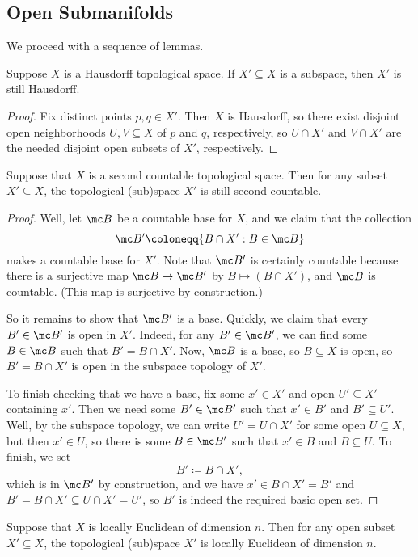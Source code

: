 \documentclass[../notes.tex]{subfiles}
\begin{document}
\subsection{Open Submanifolds}
We proceed with a sequence of lemmas.
\begin{lemma} \label{lem:sub-haus}
	Suppose $X$ is a Hausdorff topological space. If $X'\subseteq X$ is a subspace, then $X'$ is still Hausdorff.
\end{lemma}
\begin{proof}
	Fix distinct points $p,q\in X'$. Then $X$ is Hausdorff, so there exist disjoint open neighborhoods $U,V\subseteq X$ of $p$ and $q$, respectively, so $U\cap X'$ and $V\cap X'$ are the needed disjoint open subsets of $X'$, respectively.
\end{proof}
\begin{lemma} \label{lem:sub-second-countable}
	Suppose that $X$ is a second countable topological space. Then for any subset $X'\subseteq X$, the topological (sub)space $X'$ is still second countable.
\end{lemma}
\begin{proof}
	Well, let $\mc B$ be a countable base for $X$, and we claim that the collection
	\[\mc B'\coloneqq\{B\cap X':B\in\mc B\}\]
	makes a countable base for $X'$. Note that $\mc B'$ is certainly countable because there is a surjective map $\mc B\to\mc B'$ by $B\mapsto(B\cap X')$, and $\mc B$ is countable. (This map is surjective by construction.)

	So it remains to show that $\mc B'$ is a base. Quickly, we claim that every $B'\in\mc B'$ is open in $X'$. Indeed, for any $B'\in\mc B'$, we can find some $B\in\mc B$ such that $B'=B\cap X'$. Now, $\mc B$ is a base, so $B\subseteq X$ is open, so $B'=B\cap X'$ is open in the subspace topology of $X'$.

	To finish checking that we have a base, fix some $x'\in X'$ and open $U'\subseteq X'$ containing $x'$. Then we need some $B'\in\mc B'$ such that $x'\in B'$ and $B'\subseteq U'$. Well, by the subspace topology, we can write $U'=U\cap X'$ for some open $U\subseteq X$, but then $x'\in U$, so there is some $B\in\mc B'$ such that $x'\in B$ and $B\subseteq U$. To finish, we set
	\[B'\coloneqq B\cap X',\]
	which is in $\mc B'$ by construction, and we have $x'\in B\cap X'=B'$ and $B'=B\cap X'\subseteq U\cap X'=U'$, so $B'$ is indeed the required basic open set.
\end{proof}
\begin{lemma} \label{lem:sub-loc-euclid}
	Suppose that $X$ is locally Euclidean of dimension $n$. Then for any open subset $X'\subseteq X$, the topological (sub)space $X'$ is locally Euclidean of dimension $n$.
\end{lemma}
\end{document}
